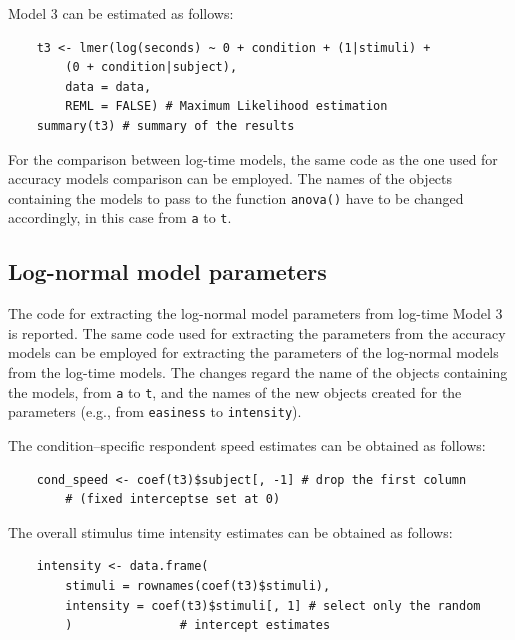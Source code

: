 \documentclass[12pt]{book}
\begin{document}
Model 3 can be estimated as follows: 
%
\begin{lstlisting}
	t3 <- lmer(log(seconds) ~ 0 + condition + (1|stimuli) + 
		(0 + condition|subject),
		data = data,
		REML = FALSE) # Maximum Likelihood estimation
	summary(t3) # summary of the results
\end{lstlisting}
%
For the comparison between log-time models, the same code as the one used for accuracy models comparison can be employed. 
The names of the objects containing the models to pass to the function \texttt{anova()} have to be changed accordingly, in this case from \texttt{a} to \texttt{t}.

\subsection{Log-normal model parameters}

The code for extracting the log-normal model parameters from log-time Model 3 is reported. 
The same code used for extracting the parameters from the accuracy models can be employed for extracting the parameters of the log-normal models from the log-time models. 
The changes regard the name of the objects containing the models, from \texttt{a} to \texttt{t}, and the names of the new objects created for the parameters (e.g., from \texttt{easiness} to \texttt{intensity}).

The condition--specific respondent speed estimates can be obtained as follows: 
%
\begin{lstlisting}
	cond_speed <- coef(t3)$subject[, -1] # drop the first column 
		# (fixed interceptse set at 0)
\end{lstlisting}
The overall stimulus time intensity estimates can be obtained as follows: 
%
\begin{lstlisting}
	intensity <- data.frame(
		stimuli = rownames(coef(t3)$stimuli),
		intensity = coef(t3)$stimuli[, 1] # select only the random
		)				# intercept estimates
\end{lstlisting}	


\backmatter
	 
	
	
	
	
	
\end{document}
